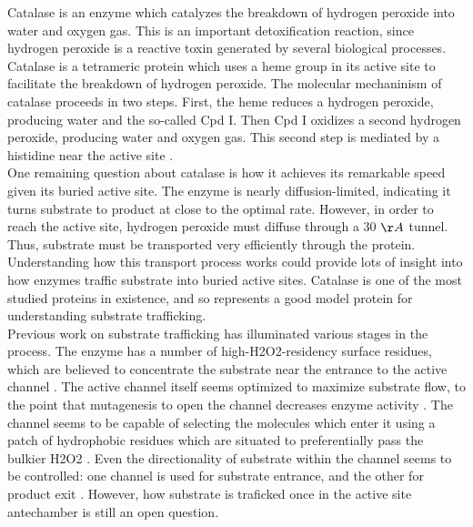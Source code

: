 \documentclass[journal=jacsat,manuscript=article]{achemso}
\begin{document}
Catalase is an enzyme which catalyzes the breakdown of hydrogen peroxide into water and oxygen gas. This is an important detoxification reaction, since hydrogen peroxide is a reactive toxin generated by several biological processes. Catalase is a tetrameric protein which uses a heme group in its active site to facilitate the breakdown of hydrogen peroxide. The molecular mechaninism of catalase proceeds in two steps. First, the heme reduces a hydrogen peroxide, producing water and the so-called Cpd I. Then Cpd I oxidizes a second hydrogen peroxide, producing water and oxygen gas. This second step is mediated by a histidine near the active site \cite{alfonso-prieto}.\\

One remaining question about catalase is how it achieves its remarkable speed given its buried active site. The enzyme is nearly diffusion-limited\cite{kcatkm, difflimit}, indicating it turns substrate to product at close to the optimal rate. However, in order to reach the active site, hydrogen peroxide must diffuse through a 30 $\AA$ tunnel\cite{substrateflow}. Thus, substrate must be transported very efficiently through the protein. Understanding how this transport process works could provide lots of insight into how enzymes traffic substrate into buried active sites. Catalase is one of the most studied proteins in existence, and so represents a good model protein for understanding substrate trafficking.\\

Previous work on substrate trafficking has illuminated various stages in the process. The enzyme has a number of high-H2O2-residency surface residues, which are believed to concentrate the substrate near the entrance to the active channel \cite{concentrateh2o2}. The active channel itself seems optimized to maximize substrate flow, to the point that mutagenesis to open the channel decreases enzyme activity \cite{substrateflow}. The channel seems to be capable of selecting the molecules which enter it using a patch of hydrophobic residues which are situated to preferentially pass the bulkier H2O2 \cite{molecularruler}. Even the directionality of substrate within the channel seems to be controlled: one channel is used for substrate entrance, and the other for product exit \cite{lateralchannel}. However, how substrate is traficked once in the active site antechamber is still an open question.\\
\end{document}
